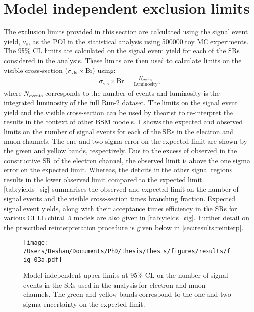 \section{Model independent exclusion limits}\label{sec:results:modelindep}
The exclusion limits provided in this section are calculated using the signal event yield, $\nu_s$, as the POI in the statistical analysis using 500000 toy MC experiments. The 95\% CL limits are calculated on the signal event yield for each of the SRs considered in the analysis. These limits are then used to calculate limits on the visible cross-section ($\sigma_\textrm{vis}\times\textrm{Br}$) using:
\begin{equation}
    \label{eq:visxs}
    \begin{aligned}
        & \sigma_\textrm{vis}\times\textrm{Br} = \frac{N_{\mathrm{events}}}{\mathrm{Luminosity}},
    \end{aligned}
\end{equation}
where $N_{\mathrm{events}}$ corresponds to the number of events and luminosity is the integrated luminosity of the full Run-2 dataset. The limits on the signal event yield and the visible cross-section can be used by theorist to re-interpret the results in the context of other BSM models. \cref{fig:limit_n} shows the expected and observed limits on the number of signal events  for each of the SRs in the electron and muon channels. The one and two sigma error on the expected limit are shown by the green and yellow bands, respectively. Due to the excess of observed in the constructive SR of the electron channel, the observed limit is above the one sigma error on the expected limit. Whereas, the deficits in the other signal regions results in the lower observed limit compared to the expected limit. \cref{tab:yields_sig} summarises the observed and expected limit on the number of signal events and the visible cross-section times branching fraction. Expected signal event yields, along with their acceptance times efficiency in the SRs for various CI LL chiral $\Lambda$ models are also given in \cref{tab:yields_sig}. Further detail on the prescribed reinterpretation procedure is given below in \cref{sec:results:reinterp}.

\begin{figure}[!htpb]

    \centering
    \texttt{[image: /Users/Deshan/Documents/PhD/thesis/Thesis/figures/results/fig\_03a.pdf]}
    \label{fig:limit_n1}
    \caption[Model independent upper limits at 95\% CL on the number of signal events in the SRs used in the analysis for electron and muon channels.]{Model independent upper limits at 95\% CL on the number of signal events in the SRs used in the analysis for electron and muon channels. The green and yellow bands correspond to the one and two sigma uncertainty on the expected limit.}
    \label{fig:limit_n}
\end{figure}

